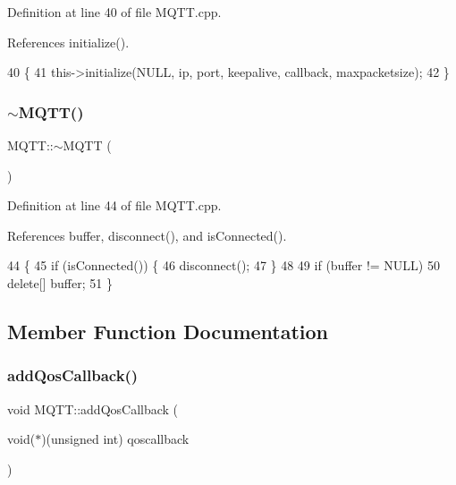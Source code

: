 Definition at line 40 of file M\+Q\+T\+T.\+cpp.



References initialize().


\begin{DoxyCode}
40                                                                                                            
                 \{
41     this->initialize(NULL, ip, port, keepalive, callback, maxpacketsize);
42 \}
\end{DoxyCode}
\mbox{\label{class_m_q_t_t_a07b8f99719144b5d3bc8d8d817de3e8e}} 
\subsubsection{$\sim$\+M\+Q\+T\+T()}
{\footnotesize\ttfamily M\+Q\+T\+T\+::$\sim$\+M\+Q\+TT (\begin{DoxyParamCaption}{ }\end{DoxyParamCaption})}



Definition at line 44 of file M\+Q\+T\+T.\+cpp.



References buffer, disconnect(), and is\+Connected().


\begin{DoxyCode}
44             \{
45     \textcolor{keywordflow}{if} (isConnected()) \{
46         disconnect();
47     \}
48 
49     \textcolor{keywordflow}{if} (buffer != NULL)
50       \textcolor{keyword}{delete}[] buffer;
51 \}
\end{DoxyCode}


\subsection{Member Function Documentation}
\mbox{\label{class_m_q_t_t_a324c79ef8a1bfaf03d7b3e73b957283b}} 
\subsubsection{add\+Qos\+Callback()}
{\footnotesize\ttfamily void M\+Q\+T\+T\+::add\+Qos\+Callback (\begin{DoxyParamCaption}\item[{void($\ast$)(unsigned int)}]{qoscallback }\end{DoxyParamCaption})}



